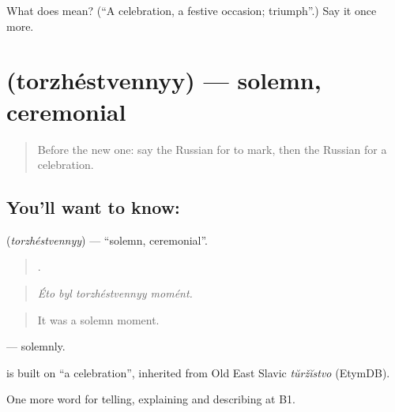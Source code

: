 \begin{tcolorbox}[breakable,colback=teal!4,colframe=teal!35!black,title={Before you move on}]
What does  mean? (\textquotedblleft{}A celebration, a festive occasion; triumph\textquotedblright{}.) Say it once more.
\end{tcolorbox}
\section[\texorpdfstring{\ru{торжественный} (torzhéstvennyy)}{торжественный (torzhéstvennyy)}]{ (torzhéstvennyy) — solemn, ceremonial}

\label{lesson:RU-C311-torzhestvennyy}



\begin{quote}
Before the new one: say the Russian for to mark, then the Russian for a celebration.
\end{quote}

\subsection*{You'll want to know: }
\textbf{} (\emph{torzhéstvennyy}) — \textquotedblleft{}solemn, ceremonial\textquotedblright{}.

\begin{quote}
   .
\end{quote}

\begin{quote}
\emph{Éto byl torzhéstvennyy momént.}
\end{quote}

\begin{quote}
It was a solemn moment.
\end{quote}

\emph{} — solemnly.

\begin{cousinweb}
\emph{} is built on \emph{} \textquotedblleft{}a celebration\textquotedblright{}, inherited from Old East Slavic \emph{tŭržĭstvo} (EtymDB).
\end{cousinweb}

\begin{grammarlens}[title={What you've built}]
One more word for telling, explaining and describing at B1.
\end{grammarlens}

